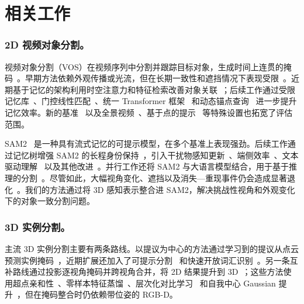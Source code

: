 
\vspace{-1.5em}
\section{相关工作}
\label{sec:related}
\vspace{-1em}

\subsubsection{2D 视频对象分割。}
视频对象分割（VOS）在视频序列中分割并跟踪目标对象，生成时间上连贯的掩码~\cite{perazzi2016benchmark, caelles2017one, voigtlaender2019feelvos, maninis2018video, wu2025denver}。早期方法依赖外观传播或光流，但在长期一致性和遮挡情况下表现受限~\cite{yang2019video, oh2019video, bhat2020learning}。近期基于记忆的架构利用时空注意力和特征检索改善对象关联~\cite{yang2021associating, cheng2022xmem, cheng2021rethinking, liu2022learning, park2022per, xu2022reliable, yang2024scalable, yang2022decoupling, li2024univs, cheng2024putting}；后续工作通过受限记忆库~\cite{zhou2024rmem}、门控线性匹配~\cite{liu2025livos}、统一 Transformer 框架~\cite{li2024onevos, zhang2025jointformer} 和动态锚点查询~\cite{zhou2024improving} 进一步提升记忆效率。新的基准~\cite{hong2023lvos} 以及全景视频~\cite{yan2024panovos}、基于点的提示~\cite{mahadevan2024point} 等特殊设置也拓宽了评估范围。

SAM2~\cite{ravi2024sam2} 是一种具有流式记忆的可提示模型，在多个基准上表现强劲。后续工作通过记忆树增强 SAM2 的长程身份保持~\cite{ding2024sam2long}，引入干扰物感知更新~\cite{videnovic2025distractor}、端侧效率~\cite{zhou2025edgetam}、文本驱动理解~\cite{cuttano2025samwise} 以及其他改进~\cite{yang2024samurai, yang2025mosam, ye2025entitysam}。并行工作还将 SAM2 与大语言模型结合，用于基于推理的分割~\cite{yuan2025sa2va, yan2024visa, bai2024one}。尽管如此，大幅视角变化、遮挡以及消失—重现事件仍会造成显著退化~\cite{ding2025mosev2, xu2018youtube, perazzi2017davis}。我们的方法通过将 3D 感知表示整合进 SAM2，解决挑战性视角和外观变化下的对象一致分割问题。

\vspace{-1em}
\subsubsection{3D 实例分割。}
主流 3D 实例分割主要有两条路线。以提议为中心的方法通过学习到的提议从点云预测实例掩码~\cite{schult2022mask3d, jiang2020pointgroup, han2020occuseg, vu2022softgroup, misra2021end, sun2023superpoint, kolodiazhnyi2024oneformer3d, takmaz2023openmask3d, piekenbrinck2025opensplat3d}，近期扩展还加入了可提示分割~\cite{zhou2024point} 和快速开放词汇识别~\cite{boudjoghra2025openyolo}。另一条互补路线通过投影逐视角掩码并跨视角合并，将 2D 结果提升到 3D~\cite{yang2023sam3d, xu2024embodiedsam, nguyen2024open3dis, boudjoghra2024open, jung2025details, xu2023neurallift, kerr2023lerf, vora2021nesf, jiang2024open, bautista2022gaudi, hsu2025openm3d, tu2023imgeonet, li2024genrc}；这些方法使用超点亲和性~\cite{yin2024sai3d}、零样本特征蒸馏~\cite{wang2024lift3d, engelmann2024opennerf}、层次化对比学习~\cite{ying2024omniseg3d, kim2024garfield} 和自我中心 Gaussian 提升~\cite{gu2024egolifter}，但在掩码整合时仍依赖带位姿的 RGB-D。

